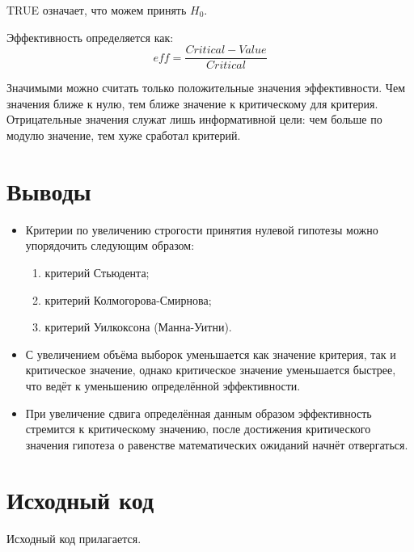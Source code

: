 \documentclass{article} %
\begin{document}
TRUE означает, что можем принять $H_0$.

Эффективность определяется как:
\begin{equation*}
    \mathit{eff} = \frac{\mathit{Critical} - \mathit{Value}}{\mathit{Critical}}
\end{equation*}

Значимыми можно считать только
положительные значения эффективности.
Чем значения ближе к нулю,
тем ближе значение к критическому
для критерия.
Отрицательные значения служат
лишь информативной цели:
чем больше по модулю значение,
тем хуже сработал критерий.

\section*{Выводы}
\begin{itemize}
    \item Критерии по увеличению строгости принятия нулевой гипотезы
        можно упорядочить следующим образом:
        \begin{enumerate}
            \item критерий Стьюдента;
            \item критерий Колмогорова-Смирнова;
            \item критерий Уилкоксона (Манна-Уитни).
        \end{enumerate}
    \item С увеличением объёма выборок уменьшается как
        значение критерия, так и критическое значение,
        однако критическое значение уменьшается быстрее,
        что ведёт к уменьшению определённой эффективности.
    \item При увеличение сдвига определённая данным образом
        эффективность стремится к критическому значению,
        после достижения критического значения
        гипотеза о равенстве математических ожиданий
        начнёт отвергаться.
\end{itemize}

\section*{Исходный код}
Исходный код прилагается.
\end{document}
